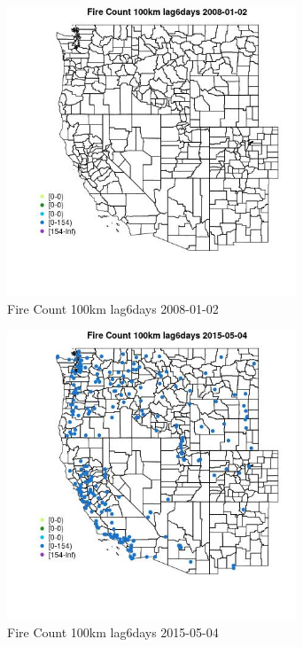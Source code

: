 \begin{figure} 
\centering  
\includegraphics[width=0.77\textwidth]{Code_Outputs/Report_ML_input_PM25_Step4_part_e_de_duplicated_aves_compiled_2019-05-18wNAs_MapObsFire_Count_100km_lag6days2008-01-02.jpg} 
\caption{\label{fig:Report_ML_input_PM25_Step4_part_e_de_duplicated_aves_compiled_2019-05-18wNAsMapObsFire_Count_100km_lag6days2008-01-02}Fire Count 100km lag6days 2008-01-02} 
\end{figure} 
 

\begin{figure} 
\centering  
\includegraphics[width=0.77\textwidth]{Code_Outputs/Report_ML_input_PM25_Step4_part_e_de_duplicated_aves_compiled_2019-05-18wNAs_MapObsFire_Count_100km_lag6days2015-05-04.jpg} 
\caption{\label{fig:Report_ML_input_PM25_Step4_part_e_de_duplicated_aves_compiled_2019-05-18wNAsMapObsFire_Count_100km_lag6days2015-05-04}Fire Count 100km lag6days 2015-05-04} 
\end{figure} 
 

